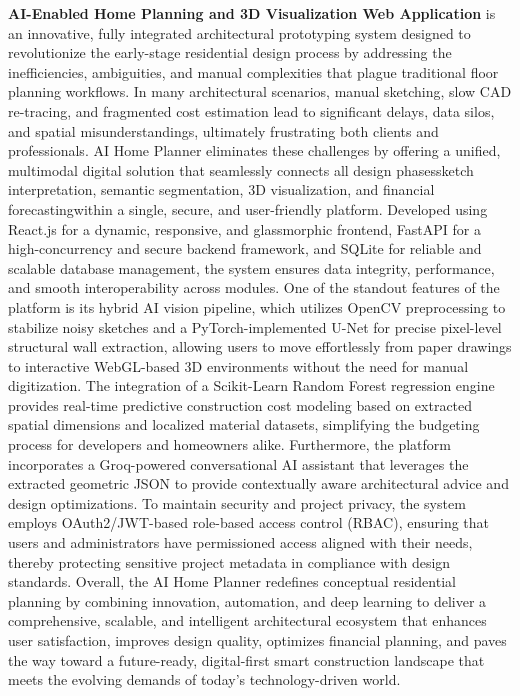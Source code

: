 \documentclass[12pt]{report}
\begin{document}
\textbf{AI-Enabled Home Planning and 3D Visualization Web Application} is an innovative, fully integrated architectural prototyping system designed to revolutionize the early-stage residential design process by addressing the inefficiencies, ambiguities, and manual complexities that plague traditional floor planning workflows. In many architectural scenarios, manual sketching, slow CAD re-tracing, and fragmented cost estimation lead to significant delays, data silos, and spatial misunderstandings, ultimately frustrating both clients and professionals. AI Home Planner eliminates these challenges by offering a unified, multimodal digital solution that seamlessly connects all design phases\-sketch interpretation, semantic segmentation, 3D visualization, and financial forecasting\-within a single, secure, and user-friendly platform. Developed using React.js for a dynamic, responsive, and glassmorphic frontend, FastAPI for a high-concurrency and secure backend framework, and SQLite for reliable and scalable database management, the system ensures data integrity, performance, and smooth interoperability across modules. One of the standout features of the platform is its hybrid AI vision pipeline, which utilizes OpenCV preprocessing to stabilize noisy sketches and a PyTorch-implemented U-Net for precise pixel-level structural wall extraction, allowing users to move effortlessly from paper drawings to interactive WebGL-based 3D environments without the need for manual digitization. The integration of a Scikit-Learn Random Forest regression engine provides real-time predictive construction cost modeling based on extracted spatial dimensions and localized material datasets, simplifying the budgeting process for developers and homeowners alike. Furthermore, the platform incorporates a Groq-powered conversational AI assistant that leverages the extracted geometric JSON to provide contextually aware architectural advice and design optimizations. To maintain security and project privacy, the system employs OAuth2/JWT-based role-based access control (RBAC), ensuring that users and administrators have permissioned access aligned with their needs, thereby protecting sensitive project metadata in compliance with design standards. Overall, the AI Home Planner redefines conceptual residential planning by combining innovation, automation, and deep learning to deliver a comprehensive, scalable, and intelligent architectural ecosystem that enhances user satisfaction, improves design quality, optimizes financial planning, and paves the way toward a future-ready, digital-first smart construction landscape that meets the evolving demands of today’s technology-driven world.
\end{document}
